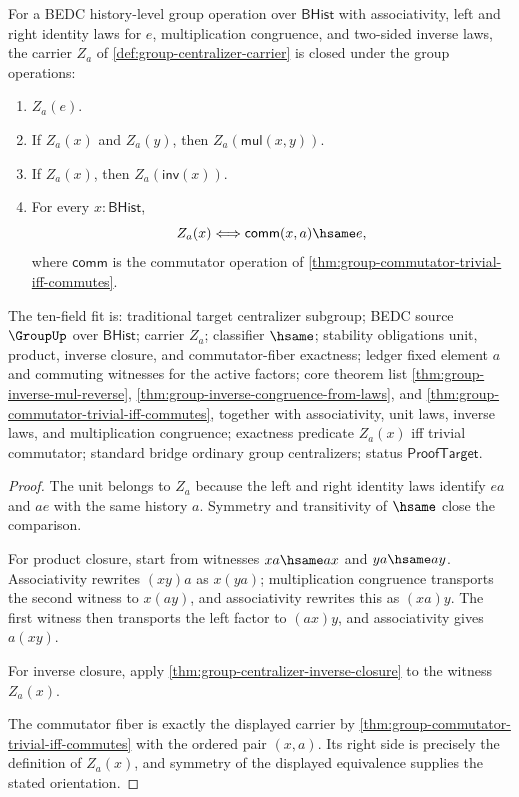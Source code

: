 \begin{theorem}
\label{thm:group-centralizer-subgroup}
For a BEDC history-level group operation over $\mathsf{BHist}$ with
associativity, left and right identity laws for $e$, multiplication
congruence, and two-sided inverse laws, the carrier $Z_a$ of
\autoref{def:group-centralizer-carrier} is closed under the group operations:
\begin{enumerate}
\item $Z_a(e)$.
\item If $Z_a(x)$ and $Z_a(y)$, then $Z_a(\mathsf{mul}(x,y))$.
\item If $Z_a(x)$, then $Z_a(\mathsf{inv}(x))$.
\item For every $x:\mathsf{BHist}$,
$$
Z_a(x) \Longleftrightarrow \mathsf{comm}(x,a)\hsame e,
$$
where $\mathsf{comm}$ is the commutator operation of
\autoref{thm:group-commutator-trivial-iff-commutes}.
\end{enumerate}
The ten-field fit is: traditional target centralizer subgroup; BEDC source
$\GroupUp$ over $\mathsf{BHist}$; carrier $Z_a$; classifier $\hsame$;
stability obligations unit, product, inverse closure, and commutator-fiber
exactness; ledger fixed element $a$ and commuting witnesses for the active
factors; core theorem list \autoref{thm:group-inverse-mul-reverse},
\autoref{thm:group-inverse-congruence-from-laws}, and
\autoref{thm:group-commutator-trivial-iff-commutes}, together with
associativity, unit laws, inverse laws, and multiplication congruence;
exactness predicate $Z_a(x)$ iff trivial commutator; standard bridge ordinary
group centralizers; status $\mathsf{ProofTarget}$.
\end{theorem}
\begin{proof}
The unit belongs to $Z_a$ because the left and right identity laws identify
$ea$ and $ae$ with the same history $a$. Symmetry and transitivity of
$\hsame$ close the comparison.

For product closure, start from witnesses $xa\hsame ax$ and $ya\hsame ay$.
Associativity rewrites $(xy)a$ as $x(ya)$; multiplication congruence transports
the second witness to $x(ay)$, and associativity rewrites this as $(xa)y$.
The first witness then transports the left factor to $(ax)y$, and
associativity gives $a(xy)$.

For inverse closure, apply
\autoref{thm:group-centralizer-inverse-closure} to the witness $Z_a(x)$.

The commutator fiber is exactly the displayed carrier by
\autoref{thm:group-commutator-trivial-iff-commutes} with the ordered pair
$(x,a)$. Its right side is precisely the definition of $Z_a(x)$, and symmetry
of the displayed equivalence supplies the stated orientation.
\end{proof}
